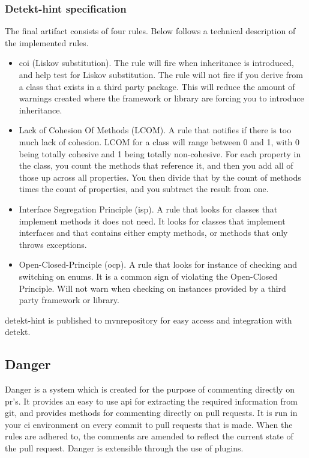 \documentclass{report}
\begin{document}
\subsubsection{Detekt-hint specification}
The final artifact consists of four rules. Below follows a technical description of the implemented rules.
\begin{itemize}
    \item\gls{coi} (Liskov substitution). The rule will fire when inheritance is introduced, and help test for Liskov substitution. The rule will not fire if you derive from a class that exists in a third party package. This will reduce the amount of warnings created where the framework or library are forcing you to introduce inheritance.         
    \item Lack of Cohesion Of Methods (LCOM). A rule that notifies if there is too much lack of cohesion. LCOM for a class will range between 0 and 1, with 0 being totally cohesive and 1 being totally non-cohesive. For each property in the class, you count the methods that reference it, and then you add all of those up across all properties. You then divide that by the count of methods times the count of properties, and you subtract the result from one\cite{}.
    \item Interface Segregation Principle (\gls{isp}). A rule that looks for classes that implement methods it does not need. It looks for classes that implement interfaces and that contains either empty methods, or methods that only throws exceptions.
    \item Open-Closed-Principle (\gls{ocp}). A rule that looks for instance of checking and switching on enums. It is a common sign of violating the Open-Closed Principle. Will not warn when checking on instances provided by a third party framework or library.
\end{itemize}

detekt-hint is published to mvnrepository for easy access and integration with detekt.


\subsection{Danger}
Danger is a system which is created for the purpose of commenting directly on \gls{pr}'s. It provides an easy to use \gls{api} for extracting the required information from git, and provides methods for commenting directly on pull requests. It is run in your \gls{ci} environment on every commit to pull requests that is made. When the rules are adhered to, the comments are amended to reflect the current state of the pull request. Danger is extensible through the use of plugins.
\end{document}
